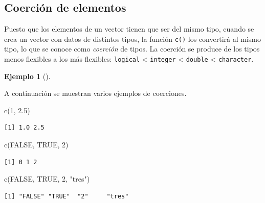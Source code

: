 \documentclass[
  a4paper,
]{scrreport}
\newenvironment{Shaded}{\begin{snugshade}}{\end{snugshade}}
\newcommand{\ConstantTok}[1]{\textcolor[rgb]{0.56,0.35,0.01}{#1}}
\newcommand{\DecValTok}[1]{\textcolor[rgb]{0.68,0.00,0.00}{#1}}
\newcommand{\FloatTok}[1]{\textcolor[rgb]{0.68,0.00,0.00}{#1}}
\newcommand{\FunctionTok}[1]{\textcolor[rgb]{0.28,0.35,0.67}{#1}}
\newcommand{\NormalTok}[1]{\textcolor[rgb]{0.00,0.23,0.31}{#1}}
\newcommand{\StringTok}[1]{\textcolor[rgb]{0.13,0.47,0.30}{#1}}
\theoremstyle{definition}
\theoremstyle{definition}
\newtheorem{example}{Ejemplo}[chapter]
\theoremstyle{remark}
\begin{document}
\hypertarget{coerciuxf3n-de-elementos}{%
\subsection{Coerción de elementos}\label{coerciuxf3n-de-elementos}}

Puesto que los elementos de un vector tienen que ser del mismo tipo,
cuando se crea un vector con datos de distintos tipos, la función
\texttt{c()} los convertirá al mismo tipo, lo que se conoce como
\emph{coerción} de tipos. La coerción se produce de los tipos menos
flexibles a los más flexibles: \texttt{logical} \textless{}
\texttt{integer} \textless{} \texttt{double} \textless{}
\texttt{character}.

\leavevmode{}%
\begin{example}[]\label{exm-coercion}

A continuación se muestran varios ejemplos de coerciones.

\begin{Shaded}
\begin{Highlighting}[]
\FunctionTok{c}\NormalTok{(}\DecValTok{1}\NormalTok{, }\FloatTok{2.5}\NormalTok{)}
\end{Highlighting}
\end{Shaded}

\begin{verbatim}
[1] 1.0 2.5
\end{verbatim}

\begin{Shaded}
\begin{Highlighting}[]
\FunctionTok{c}\NormalTok{(}\ConstantTok{FALSE}\NormalTok{, }\ConstantTok{TRUE}\NormalTok{, }\DecValTok{2}\NormalTok{)}
\end{Highlighting}
\end{Shaded}

\begin{verbatim}
[1] 0 1 2
\end{verbatim}

\begin{Shaded}
\begin{Highlighting}[]
\FunctionTok{c}\NormalTok{(}\ConstantTok{FALSE}\NormalTok{, }\ConstantTok{TRUE}\NormalTok{, }\DecValTok{2}\NormalTok{, }\StringTok{"tres"}\NormalTok{)}
\end{Highlighting}
\end{Shaded}

\begin{verbatim}
[1] "FALSE" "TRUE"  "2"     "tres" 
\end{verbatim}

\end{example}
\end{document}
